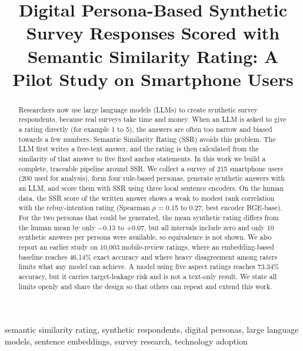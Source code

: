 \documentclass[conference]{IEEEtran}
\begin{document}
\title{Digital Persona-Based Synthetic Survey Responses Scored with Semantic Similarity Rating: A Pilot Study on Smartphone Users}

\author{
}

\maketitle

\begin{abstract}
Researchers now use large language models (LLMs) to create synthetic survey respondents, because real surveys take time and money. When an LLM is asked to give a rating directly (for example 1 to 5), the answers are often too narrow and biased towards a few numbers. Semantic Similarity Rating (SSR) avoids this problem. The LLM first writes a free-text answer, and the rating is then calculated from the similarity of that answer to five fixed anchor statements. In this work we build a complete, traceable pipeline around SSR. We collect a survey of 215 smartphone users (200 used for analysis), form four rule-based personas, generate synthetic answers with an LLM, and score them with SSR using three local sentence encoders. On the human data, the SSR score of the written answer shows a weak to modest rank correlation with the rebuy-intention rating (Spearman $\rho$ = 0.15 to 0.27, best encoder BGE-base). For the two personas that could be generated, the mean synthetic rating differs from the human mean by only $-$0.13 to $+$0.07, but all intervals include zero and only 10 synthetic answers per persona were available, so equivalence is not shown. We also report an earlier study on 10,003 mobile-review ratings, where an embedding-based baseline reaches 46.14\% exact accuracy and where heavy disagreement among raters limits what any model can achieve. A model using five aspect ratings reaches 73.34\% accuracy, but it carries target-leakage risk and is not a text-only result. We state all limits openly and share the design so that others can repeat and extend this work.
\end{abstract}

\begin{IEEEkeywords}
semantic similarity rating, synthetic respondents, digital personas, large language models, sentence embeddings, survey research, technology adoption
\end{IEEEkeywords}
\end{document}
